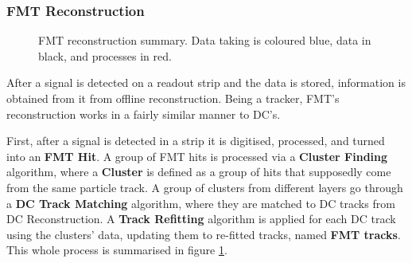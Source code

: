 \subsubsection{FMT Reconstruction}
    \begin{figure}
        \centering{}
        \caption[FMT reconstruction summary]{FMT reconstruction summary. Data taking is coloured blue, data in black, and processes in red.}
        \label{fig::fmt_recon}
    \end{figure}

    After a signal is detected on a readout strip and the data is stored, information is obtained from it from offline reconstruction.
    Being a tracker, FMT's reconstruction works in a fairly similar manner to DC's.

    First, after a signal is detected in a strip it is digitised, processed, and turned into an \textbf{FMT Hit}.
    A group of FMT hits is processed via a \textbf{Cluster Finding} algorithm, where a \textbf{Cluster} is defined as a group of hits that supposedly come from the same particle track.
    A group of clusters from different layers go through a \textbf{DC Track Matching} algorithm, where they are matched to DC tracks from DC Reconstruction.
    A \textbf{Track Refitting} algorithm is applied for each DC track using the clusters' data, updating them to re-fitted tracks, named \textbf{FMT tracks}.
    This whole process is summarised in figure \ref{fig::fmt_recon}.

\clearpage
